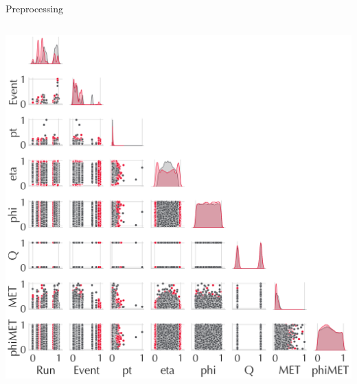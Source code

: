 \documentclass{beamer}
\begin{document}
\begin{frame}{Preprocessing}
\begin{columns}[b]
      \includegraphics[width=\linewidth]{./Images/Wpairplot_scaled.png}
    \end{columns}%


\end{frame}
\end{document}
